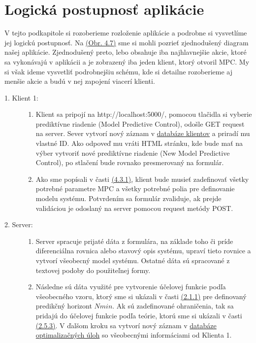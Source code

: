 \section{Logická postupnosť aplikácie}
V tejto podkapitole si rozoberieme rozloženie aplikácie a podrobne si vysvetlíme jej logickú postupnosť. Na \hyperref[fig:ArchitekturaAPK]{(Obr. 4.7)} sme si mohli pozrieť zjednodušený diagram našej aplikácie. Zjednodušený preto, lebo obsahuje iba najhlavnejšie akcie, ktoré sa vykonávajú v aplikácii a je zobrazený iba jeden klient, ktorý otvoril MPC. My si však ideme vysvetliť podrobnejšiu schému, kde si detailne rozoberieme aj menšie akcie a budú v nej zapojení viacerí klienti.
\begin{description}
\item[1. Klient 1:]{\hfill
	\begin{enumerate}
		\item{
			Klient sa pripojí na http://localhost:5000/, pomocou tlačidla si vyberie prediktívne riadenie (Model Predictive Control), odošle GET request na server. Sever vytvorí nový záznam v \hyperref[DB:Klient]{databáze klientov} a priradí mu vlastné ID. Ako odpoveď mu vráti HTML stránku, kde bude mať na výber vytvoriť nové prediktívne riadenie (New Model Predictive Control), po stlačení bude rovnako presmerovaný na formulár.
		}
		\item{
			Ako sme popísali v časti \hyperref[subse:Formular]{(4.3.1)}, klient bude musieť zadefinovať všetky potrebné parametre MPC a všetky potrebné polia pre definovanie modelu systému. Potvrdením sa formulár zvaliduje, ak prejde validáciou je odoslaný na server pomocou request metódy POST.
		}
	\end{enumerate}
}
\item[2. Server:]{\hfill
	\begin{enumerate}
		\item{
			Server spracuje prijaté dáta z formulára, na základe toho či príde diferenciálna rovnica alebo stavový opis systému, upraví tieto rovnice a vytvorí všeobecný model systému. Ostatné dáta sú spracované z textovej podoby do použiteľnej formy.
		}
		\item{
			Následne sú dáta využité pre vytvorenie účelovej funkcie podľa všeobecného vzoru, ktorý sme si ukázali v časti \hyperref[subse:MPC]{(2.1.1)} pre definovaný predikčný horizont $Nmin$. Ak sú zadefinované ohraničenia, tak sa pridajú do účelovej funkcie podľa teórie, ktorú sme si ukázali v časti \hyperref[subse:Ohranicenia]{(2.5.3)}. V ďalšom kroku sa vytvorí nový záznam v \hyperref[DB:OPT]{databáze optimalizačných úloh} so všeobecnými informáciami od Klienta 1.
}
\end{enumerate}}
\end{description}

